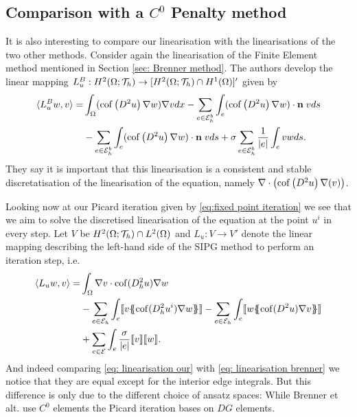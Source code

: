 \subsection{Comparison with a $C^0$ Penalty method}
It is also interesting to compare our linearisation with the linearisations of the two other methods.
Consider again the linearisation of the Finite Element method mentioned in Section \ref{sec: Brenner method}. The authors develop the linear mapping $L^B_u:H^2(\Omega; \mathcal{T}_h) \rightarrow [H^2(\Omega; \mathcal{T}_h) \cap H^1(\Omega)]'$ given by
\begin{align}
 \langle L^B_{u} w, v \rangle
	=&\int_\Omega (\operatorname{cof} \left( D^2  u \right)\nabla w) \nabla v dx
		- \sum_{e \in \mathcal{E}_h^b} \int_{e} (\operatorname{cof} \left( D^2 u \right)\nabla w) \cdot \mathbf n \; v ds \nonumber \\
		&-  \sum_{e \in \mathcal{E}_h^b} \int_{e} (\operatorname{cof} \left( D^2 u \right)\nabla w) \cdot \mathbf n \; v ds
		+ \sigma \sum_{e \in \mathcal{E}_h^b} \frac 1 {|e|} \int_e v w ds.
		\label{eq: linearisation brenner}
\end{align}
They say it is important that this linearisation is a consistent and stable discretatisation of the linearisation of the \MA equation, namely $\nabla \cdot \left( \operatorname{cof} \left( D^2 u  \right) \nabla (v) \right)$.

Looking now at our Picard iteration given by \ref{eq:fixed point iteration} we see that we aim to solve the discretised linearisation of the \MA equation at the point $u^i$ in every step.
Let $V$ be $H^2(\Omega; \mathcal{T}_h) \cap L^2(\Omega)$ and $L_u: V \rightarrow V'$ denote the linear mapping describing the left-hand side of the SIPG method to perform an iteration step, i.e.
\begin{align}
	\bilin {L_u w} v =
 &\int_{\Omega} \nabla v \cdot \cof(D_h^2 u) \nabla w  \nonumber\\
 & -\sum\limits_{e \in \edges}\int_{e} \jump {v \average { \cof(D_h^2 u^{i}) \nabla w} }
 - \sum\limits_{e \in \edges}\int_{e} \jump {w \average{ \cof(D^2 u) \nabla v} } \nonumber\\  
 & +\sum\limits_{e \in \bigEps} \int_e \frac \sigma {|e|} \jump {v}  \jump {w}. \label{eq: linearisation our}
\end{align}
And indeed comparing \eqref{eq: linearisation our} with \eqref{eq: linearisation brenner} we notice that they are equal except for the interior edge integrals. But this difference is only due to the different choice of ansatz spaces: While Brenner et alt. use $C^0$ elements the Picard iteration bases on $DG$ elements.

